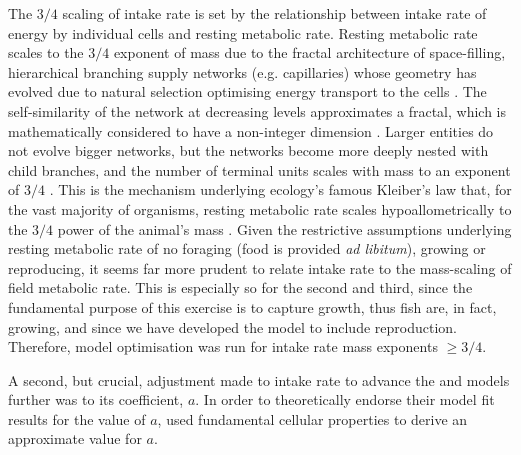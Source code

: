 \documentclass[a4paper]{article} %
\begin{document}
The $3/4$ scaling of intake rate is set by the relationship between intake rate of energy by individual cells and resting metabolic rate. Resting metabolic rate scales to the $3/4$ exponent of mass due to the fractal architecture of space-filling, hierarchical branching supply networks (e.g. capillaries) whose geometry has evolved due to natural selection optimising energy transport to the cells \autocite{West1997, West2005}. The self-similarity of the network at decreasing levels approximates a fractal, which is mathematically considered to have a non-integer dimension \autocite{Hausdorff1918, Mandelbrot1982}. Larger entities do not evolve bigger networks, but the networks become more deeply nested with child branches, and the number of terminal units scales with mass to an exponent of $3/4$  \autocite{West1997}. This is the mechanism underlying ecology's famous Kleiber's law that, for the vast majority of organisms, resting metabolic rate scales hypoallometrically to the $3/4$ power of the animal's mass \autocite{Kleiber1947, peters1983, niklas1994plant}. Given the restrictive assumptions underlying resting metabolic rate of no foraging (food is provided \textit{ad libitum}), growing or reproducing, it seems far more prudent to relate intake rate to the mass-scaling of field metabolic rate. This is especially so for the second and third, since the fundamental purpose of this exercise is to capture growth, thus fish are, in fact, growing, and since we have developed the model to include reproduction. Therefore, model optimisation was run for intake rate mass exponents $\geq 3/4$.

A second, but crucial, adjustment made to intake rate to advance the \cite{West2001} and \cite{Charnov2001} models further was to its coefficient, $a$. In order to theoretically endorse their model fit results for the value of $a$, \cite{West2001} used fundamental cellular properties to derive an approximate value for $a$. 
\end{document}
